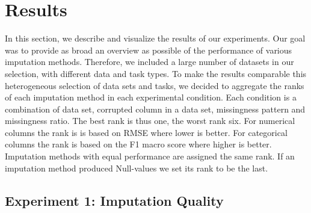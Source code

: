 \section{Results}
\label{sec:results}


In this section, we describe and visualize the results of our experiments.
%
Our goal was to provide as broad an overview as possible of the performance of various imputation methods. Therefore, we included a large number of datasets in our selection, with different data and task types. To make the results comparable this heterogeneous selection of data sets and tasks, we decided to aggregate the ranks of each imputation method in each experimental condition. Each condition is a combination of data set, corrupted column in a data set, missingness pattern and missingness ratio. The best rank is thus one, the worst rank six. For numerical columns the rank is is based on RMSE where lower is better. For categorical columns the rank is based on the F1 macro score where higher is better. Imputation methods with equal performance are assigned the same rank. If an imputation method produced Null-values we set its rank to be the last.



\subsection{Experiment 1: Imputation Quality}

